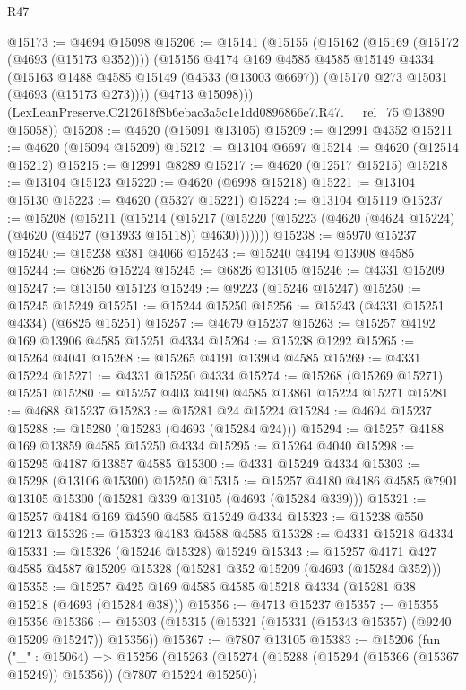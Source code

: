 \begin{lexlean}{R47}
\begin{coremodule}
@15173 := @4694 @15098
@15206 := @15141
    (@15155
      (@15162
        (@15169 (@15172 (@4693 (@15173 @352))))
        (@15156
          @4174
          @169
          @4585
          @4585
          @15149
          @4334
          (@15163
            @1488
            @4585
            @15149
            (@4533 (@13003 @6697))
            (@15170 @273 @15031 (@4693 (@15173 @273))))
          (@4713 @15098)))
      (LexLeanPreserve.C212618f8b6ebac3a5c1e1dd0896866e7.R47.__rel_75 @13890 @15058))
@15208 := @4620 (@15091 @13105)
@15209 := @12991 @4352
@15211 := @4620 (@15094 @15209)
@15212 := @13104 @6697
@15214 := @4620 (@12514 @15212)
@15215 := @12991 @8289
@15217 := @4620 (@12517 @15215)
@15218 := @13104 @15123
@15220 := @4620 (@6998 @15218)
@15221 := @13104 @15130
@15223 := @4620 (@5327 @15221)
@15224 := @13104 @15119
@15237 := @15208
    (@15211
      (@15214
        (@15217 (@15220 (@15223 (@4620 (@4624 @15224) (@4620 (@4627 (@13933 @15118)) @4630)))))))
@15238 := @5970 @15237
@15240 := @15238 @381 @4066
@15243 := @15240 @4194 @13908 @4585
@15244 := @6826 @15224
@15245 := @6826 @13105
@15246 := @4331 @15209
@15247 := @13150 @15123
@15249 := @9223 (@15246 @15247)
@15250 := @15245 @15249
@15251 := @15244 @15250
@15256 := @15243 (@4331 @15251 @4334) (@6825 @15251)
@15257 := @4679 @15237
@15263 := @15257 @4192 @169 @13906 @4585 @15251 @4334
@15264 := @15238 @1292
@15265 := @15264 @4041
@15268 := @15265 @4191 @13904 @4585
@15269 := @4331 @15224
@15271 := @4331 @15250 @4334
@15274 := @15268 (@15269 @15271) @15251
@15280 := @15257 @403 @4190 @4585 @13861 @15224 @15271
@15281 := @4688 @15237
@15283 := @15281 @24 @15224
@15284 := @4694 @15237
@15288 := @15280 (@15283 (@4693 (@15284 @24)))
@15294 := @15257 @4188 @169 @13859 @4585 @15250 @4334
@15295 := @15264 @4040
@15298 := @15295 @4187 @13857 @4585
@15300 := @4331 @15249 @4334
@15303 := @15298 (@13106 @15300) @15250
@15315 := @15257 @4180 @4186 @4585 @7901 @13105 @15300 (@15281 @339 @13105 (@4693 (@15284 @339)))
@15321 := @15257 @4184 @169 @4590 @4585 @15249 @4334
@15323 := @15238 @550 @1213
@15326 := @15323 @4183 @4588 @4585
@15328 := @4331 @15218 @4334
@15331 := @15326 (@15246 @15328) @15249
@15343 := @15257 @4171 @427 @4585 @4587 @15209 @15328 (@15281 @352 @15209 (@4693 (@15284 @352)))
@15355 := @15257 @425 @169 @4585 @4585 @15218 @4334 (@15281 @38 @15218 (@4693 (@15284 @38)))
@15356 := @4713 @15237
@15357 := @15355 @15356
@15366 := @15303 (@15315 (@15321 (@15331 (@15343 @15357) (@9240 @15209 @15247)) @15356))
@15367 := @7807 @13105
@15383 := @15206
    (fun ("_" : @15064) =>
    @15256
      (@15263
        (@15274 (@15288 (@15294 (@15366 (@15367 @15249)) @15356)) (@7807 @15224 @15250))

\end{coremodule}
\end{lexlean}
